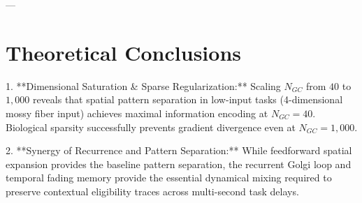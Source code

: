 \documentclass[11pt,twoside,a4paper]{article}
\begin{document}
---

\section{Theoretical Conclusions}

1. **Dimensional Saturation \& Sparse Regularization:**
   Scaling $N_{GC}$ from $40$ to $1,000$ reveals that spatial pattern separation in low-input tasks (4-dimensional mossy fiber input) achieves maximal information encoding at $N_{GC} = 40$. Biological sparsity successfully prevents gradient divergence even at $N_{GC} = 1,000$.
   
2. **Synergy of Recurrence and Pattern Separation:**
   While feedforward spatial expansion provides the baseline pattern separation, the recurrent Golgi loop and temporal fading memory provide the essential dynamical mixing required to preserve contextual eligibility traces across multi-second task delays.
\end{document}
